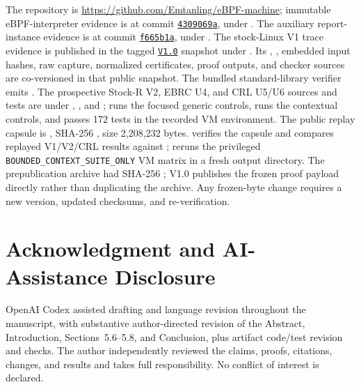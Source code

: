 \documentclass[conference]{IEEEtran}
\begin{document}
The repository is \url{https://github.com/Emtanling/eBPF-machine}; immutable eBPF-interpreter evidence is at commit \href{https://github.com/Emtanling/eBPF-machine/tree/4309069a1f94d642d5c1402eb710e089c85059b1}{\texttt{4309069a}}, under . The auxiliary report-instance evidence is at commit \href{https://github.com/Emtanling/eBPF-machine/tree/f665b1a2f9a772ee9b2c08a73d116ea283aa5efb}{\texttt{f665b1a}}, under . The stock-Linux V1 trace evidence is published in the tagged \href{https://github.com/Emtanling/eBPF-machine/tree/V1.0/residuality-auditor/stock-linux-r-proof}{\texttt{V1.0}} snapshot under . Its , , embedded input hashes, raw capture, normalized certificates, proof outputs, and checker sources are co-versioned in that public snapshot. The bundled standard-library verifier emits . The prospective Stock-R V2, EBRC U4, and CRL U5/U6 sources and tests are under , , and ;  runs the focused generic controls,  runs the contextual controls, and  passes 172 tests in the recorded VM environment. The public replay capsule is , SHA-256 , size 2,208,232 bytes.  verifies the capsule and compares replayed V1/V2/CRL results against ;  reruns the privileged \texttt{BOUNDED\_CONTEXT\_SUITE\_ONLY} VM matrix in a fresh output directory. The prepublication archive  had SHA-256 ; V1.0 publishes the frozen proof payload directly rather than duplicating the archive. Any frozen-byte change requires a new version, updated checksums, and re-verification.

\section*{Acknowledgment and AI-Assistance Disclosure}

OpenAI Codex assisted drafting and language revision throughout the manuscript, with substantive author-directed revision of the Abstract, Introduction, Sections~5.6--5.8, and Conclusion, plus artifact code/test revision and checks. The author independently reviewed the claims, proofs, citations, changes, and results and takes full responsibility. No conflict of interest is declared.
\end{document}
